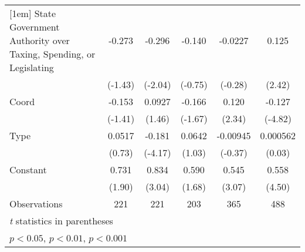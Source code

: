 {\begin{tabular}{l*{5}{c}}
[1em]
State Government Authority over Taxing, Spending, or Legislating&   -0.273         &   -0.296\sym{*}  &   -0.140         &  -0.0227         &    0.125\sym{*}  \\
                &  (-1.43)         &  (-2.04)         &  (-0.75)         &  (-0.28)         &   (2.42)         \\
[1em]
Coord           &   -0.153         &   0.0927         &   -0.166         &    0.120\sym{*}  &   -0.127\sym{***}\\
                &  (-1.41)         &   (1.46)         &  (-1.67)         &   (2.34)         &  (-4.82)         \\
[1em]
Type            &   0.0517         &   -0.181\sym{***}&   0.0642         & -0.00945         & 0.000562         \\
                &   (0.73)         &  (-4.17)         &   (1.03)         &  (-0.37)         &   (0.03)         \\
[1em]
Constant        &    0.731         &    0.834\sym{**} &    0.590         &    0.545\sym{**} &    0.558\sym{***}\\
                &   (1.90)         &   (3.04)         &   (1.68)         &   (3.07)         &   (4.50)         \\
\hline
Observations    &      221         &      221         &      203         &      365         &      488         \\
\hline\hline
\multicolumn{6}{l}{\footnotesize \textit{t} statistics in parentheses}\\
\multicolumn{6}{l}{\footnotesize \sym{*} \(p<0.05\), \sym{**} \(p<0.01\), \sym{***} \(p<0.001\)}\\
\end{tabular}
}
